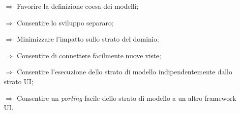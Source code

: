 \begin{itemize}
    \item [$\Rightarrow$] Favorire la definizione coesa dei modelli;
    \item [$\Rightarrow$] Consentire lo sviluppo separaro;
    \item [$\Rightarrow$] Minimizzare l'impatto sullo strato del dominio;
    \item [$\Rightarrow$] Consentire di connettere facilmente nuove viste;
    \item [$\Rightarrow$] Consentire l'esecuzione dello strato di modello indipendentemente dallo strato UI;
    \item [$\Rightarrow$] Consentire un \textit{porting} facile dello strato di modello a un altro framework UI.
\end{itemize}

